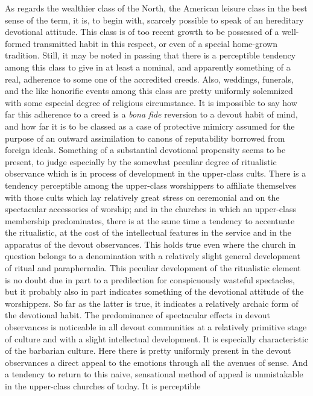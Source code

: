 \documentclass[12pt]{report}
\begin{document}
As regards the wealthier class of the North, the American leisure class
in the best sense of the term, it is, to begin with, scarcely possible
to speak of an hereditary devotional attitude. This class is of too
recent growth to be possessed of a well-formed transmitted habit in this
respect, or even of a special home-grown tradition. Still, it may be
noted in passing that there is a perceptible tendency among this class
to give in at least a nominal, and apparently something of a real,
adherence to some one of the accredited creeds. Also, weddings,
funerals, and the like honorific events among this class are
pretty uniformly solemnized with some especial degree of religious
circumstance. It is impossible to say how far this adherence to a creed
is a \emph{bona fide} reversion to a devout habit of mind, and how far it is to
be classed as a case of protective mimicry assumed for the purpose of
an outward assimilation to canons of reputability borrowed from foreign
ideals. Something of a substantial devotional propensity seems to
be present, to judge especially by the somewhat peculiar degree of
ritualistic observance which is in process of development in the
upper-class cults. There is a tendency perceptible among the upper-class
worshippers to affiliate themselves with those cults which lay
relatively great stress on ceremonial and on the spectacular accessories
of worship; and in the churches in which an upper-class membership
predominates, there is at the same time a tendency to accentuate the
ritualistic, at the cost of the intellectual features in the service and
in the apparatus of the devout observances. This holds true even where
the church in question belongs to a denomination with a relatively
slight general development of ritual and paraphernalia. This peculiar
development of the ritualistic element is no doubt due in part to a
predilection for conspicuously wasteful spectacles, but it probably
also in part indicates something of the devotional attitude of the
worshippers. So far as the latter is true, it indicates a relatively
archaic form of the devotional habit. The predominance of spectacular
effects in devout observances is noticeable in all devout communities at
a relatively primitive stage of culture and with a slight intellectual
development. It is especially characteristic of the barbarian culture.
Here there is pretty uniformly present in the devout observances a
direct appeal to the emotions through all the avenues of sense. And
a tendency to return to this naive, sensational method of appeal is
unmistakable in the upper-class churches of today. It is perceptible
\end{document}
